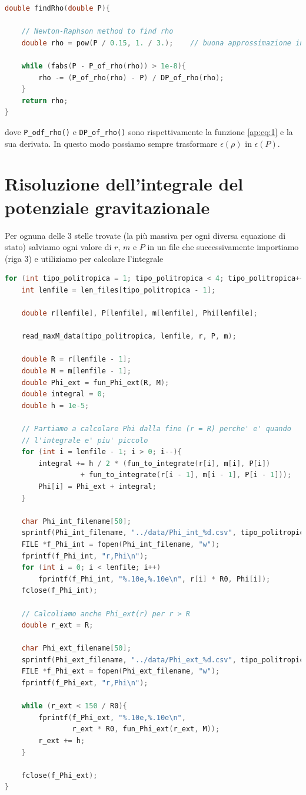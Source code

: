 \documentclass[a4paper, titlepage]{article}
\begin{document}
\begin{lstlisting}[language=C]
double findRho(double P){

    // Newton-Raphson method to find rho
    double rho = pow(P / 0.15, 1. / 3.);    // buona approssimazione iniziale
                                           
    while (fabs(P - P_of_rho(rho)) > 1e-8){
        rho -= (P_of_rho(rho) - P) / DP_of_rho(rho);
    }
    return rho;
}
\end{lstlisting}

dove \texttt{P\_odf\_rho()} e \texttt{DP\_of\_rho()} sono rispettivamente la
funzione \ref{ap:eq:1} e la sua derivata. In questo modo possiamo sempre
trasformare $\epsilon (\rho)$ in $\epsilon (P)$.


\section{Risoluzione dell'integrale del potenziale gravitazionale}
\label{ap:Phi}

Per ognuna delle 3 stelle trovate (la più massiva per ogni diversa equazione di
stato) salviamo ogni valore di $r$, $m$ e $P$ in un file che successivamente
importiamo (riga 3) e utiliziamo per calcolare l'integrale

\begin{lstlisting}[language=C]
for (int tipo_politropica = 1; tipo_politropica < 4; tipo_politropica++){
    int lenfile = len_files[tipo_politropica - 1];

    double r[lenfile], P[lenfile], m[lenfile], Phi[lenfile];

    read_maxM_data(tipo_politropica, lenfile, r, P, m);

    double R = r[lenfile - 1];
    double M = m[lenfile - 1];
    double Phi_ext = fun_Phi_ext(R, M);
    double integral = 0;
    double h = 1e-5;

    // Partiamo a calcolare Phi dalla fine (r = R) perche' e' quando
    // l'integrale e' piu' piccolo
    for (int i = lenfile - 1; i > 0; i--){
        integral += h / 2 * (fun_to_integrate(r[i], m[i], P[i])
                  + fun_to_integrate(r[i - 1], m[i - 1], P[i - 1]));
        Phi[i] = Phi_ext + integral;
    }

    char Phi_int_filename[50];
    sprintf(Phi_int_filename, "../data/Phi_int_%d.csv", tipo_politropica);
    FILE *f_Phi_int = fopen(Phi_int_filename, "w");
    fprintf(f_Phi_int, "r,Phi\n");
    for (int i = 0; i < lenfile; i++)
        fprintf(f_Phi_int, "%.10e,%.10e\n", r[i] * R0, Phi[i]);
    fclose(f_Phi_int);

    // Calcoliamo anche Phi_ext(r) per r > R
    double r_ext = R;

    char Phi_ext_filename[50];
    sprintf(Phi_ext_filename, "../data/Phi_ext_%d.csv", tipo_politropica);
    FILE *f_Phi_ext = fopen(Phi_ext_filename, "w");
    fprintf(f_Phi_ext, "r,Phi\n");

    while (r_ext < 150 / R0){
        fprintf(f_Phi_ext, "%.10e,%.10e\n",
                r_ext * R0, fun_Phi_ext(r_ext, M));
        r_ext += h;
    }

    fclose(f_Phi_ext);
}
\end{lstlisting}
\end{document}
